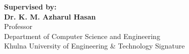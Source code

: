 \documentclass[12pt]{article}
\begin{document}
\begin{titlepage}
\begin{center}
{    %
    \begin{flushleft}
    {\fontsize{12}{1.5}\selectfont \textbf{Supervised by: }}\\
    \vspace{12pt}
    \hspace*{0.8in} %
    {\fontsize{12}{1.5}\selectfont \textbf{Dr. K. M. Azharul Hasan}}\\
    \hspace*{0.8in} %
    {\fontsize{12}{1.5}\selectfont Professor}\\
    \hspace*{0.8in} %
    {\fontsize{12}{1.5}\selectfont Department of Computer Science and Engineering \hspace{.65in}}\\
    \hspace*{0.8in} %
    {\fontsize{12}{1.5}\selectfont Khulna University of Engineering \& Technology \hspace{1in} Signature}\\
    \vspace{12pt}
    \vspace{12pt}
    \vspace{12pt}


\end{flushleft}}
\end{center}
\end{titlepage}
\end{document}
